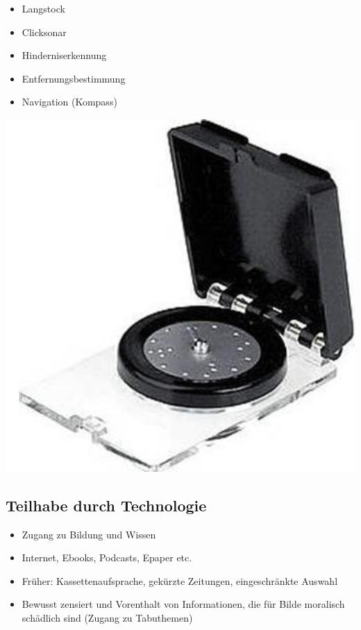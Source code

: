 \documentclass[paper=a4, fontsize=11pt]{scrartcl} %
\numberwithin{equation}{section} %
\numberwithin{figure}{section} %
\numberwithin{table}{section} %
\begin{document}
\begin{minipage}[c]{0.55\textwidth}
\begin{itemize}
\item Langstock
\item Clicksonar
\item Hinderniserkennung
\item Entfernungsbestimmung
\item Navigation (Kompass)
\end{itemize}
\end{minipage}
\begin{minipage}[c]{0.35\textwidth}
\includegraphics[width=\textwidth]{imgs/kompass}
\end{minipage}

\subsection{Teilhabe durch Technologie}

\begin{itemize}
\item Zugang zu Bildung und Wissen
\item Internet, Ebooks, Podcasts, Epaper etc.
\item Früher: Kassettenaufsprache, gekürzte Zeitungen, eingeschränkte Auswahl
\item Bewusst zensiert und Vorenthalt von Informationen, die für Bilde moralisch schädlich sind (Zugang zu Tabuthemen)
\end{itemize}
\end{document}
